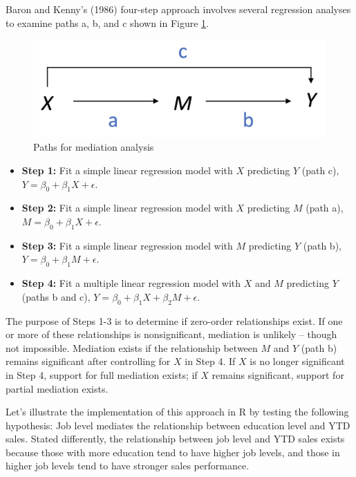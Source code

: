 \documentclass[
]{book}
\providecommand{\tightlist}{%
  \setlength{\itemsep}{0pt}\setlength{\parskip}{0pt}}
\begin{document}
Baron and Kenny's (1986) four-step approach involves several regression analyses to examine paths a, b, and c shown in Figure \ref{fig:med-paths}.

\begin{figure}

{\centering \includegraphics[width=0.75\linewidth]{graphics/mediation_paths} 

}

\caption{Paths for mediation analysis}\label{fig:med-paths}
\end{figure}

\begin{itemize}
\tightlist
\item
  \textbf{Step 1:} Fit a simple linear regression model with \(X\) predicting \(Y\) (path c), \(Y = \beta_0 + \beta_1 X + \epsilon\).
\item
  \textbf{Step 2:} Fit a simple linear regression model with \(X\) predicting \(M\) (path a), \(M = \beta_0 + \beta_1 X + \epsilon\).
\item
  \textbf{Step 3:} Fit a simple linear regression model with \(M\) predicting \(Y\) (path b), \(Y = \beta_0 + \beta_1 M + \epsilon\).
\item
  \textbf{Step 4:} Fit a multiple linear regression model with \(X\) and \(M\) predicting \(Y\) (paths b and c), \(Y = \beta_0 + \beta_1 X + \beta_2 M + \epsilon\).
\end{itemize}

The purpose of Steps 1-3 is to determine if zero-order relationships exist. If one or more of these relationships is nonsignificant, mediation is unlikely -- though not impossible. Mediation exists if the relationship between \(M\) and \(Y\) (path b) remains significant after controlling for \(X\) in Step 4. If \(X\) is no longer significant in Step 4, support for full mediation exists; if \(X\) remains significant, support for partial mediation exists.

Let's illustrate the implementation of this approach in R by testing the following hypothesis: Job level mediates the relationship between education level and YTD sales. Stated differently, the relationship between job level and YTD sales exists because those with more education tend to have higher job levels, and those in higher job levels tend to have stronger sales performance.
\end{document}
